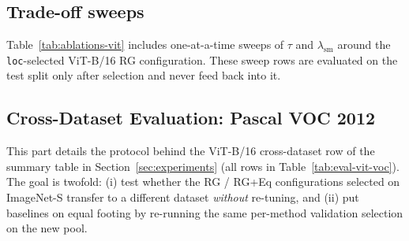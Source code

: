 \documentclass[twoside]{article}
\makeatletter
\newcommand{\1}{\mathbf{1}}
\providecommand{\captionof}[1]{\def\@captype{#1}\caption}
\makeatother
\begin{document}
\begin{center}
    \captionof{table}{ViT-B/16, ImageNet-S test split: all rows with 95\% bootstrap confidence
    intervals. Metrics as in Table~\ref{tab:eval-vit}; configuration symbols and row labels:
    Appendix~\ref{app:config-symbols}.}
    \label{tab:test-ci-vit}
\end{center}

\begin{center}
    \captionof{table}{VGG-16, ImageNet-S test split: all rows with 95\% bootstrap confidence intervals,
    as in Table~\ref{tab:test-ci-vit}.}
    \label{tab:test-ci-vgg}
\end{center}

\begin{center}
    \captionof{table}{ResNet-50, ImageNet-S test split: all rows with 95\% bootstrap confidence
    intervals, as in Table~\ref{tab:test-ci-vit}.}
    \label{tab:test-ci-resnet}
\end{center}

\subsection{Trade-off sweeps}\label{app:tradeoff-sweeps}\label{app:dual-sweeps}

Table~\ref{tab:ablations-vit} includes one-at-a-time sweeps of $\tau$ and $\lambda_{\mathrm{sm}}$
around the \texttt{loc}-selected ViT-B/16 \ac{RG} configuration. These sweep rows are evaluated on
the test split only after selection and never feed back into it.

\subsection{Cross-Dataset Evaluation: Pascal VOC 2012}\label{app:voc-cross-data}

This part details the protocol behind the ViT-B/16 cross-dataset row of the summary table in
Section~\ref{sec:experiments} (all rows in Table~\ref{tab:eval-vit-voc}). The goal is twofold: (i)
test whether the \ac{RG} / \ac{RG}+Eq configurations selected on ImageNet-S transfer to a different
dataset \emph{without} re-tuning, and (ii) put baselines on equal footing by re-running the same
per-method validation selection on the new pool.
\end{document}
